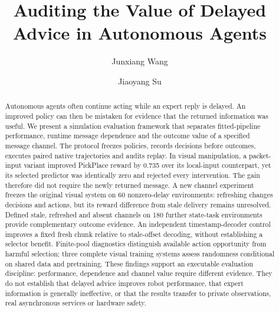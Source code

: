 \documentclass[smallextended]{svjour3}
\begin{document}
\title{Auditing the Value of Delayed Advice in Autonomous Agents}
\author{Junxiang Wang \and Jiaoyang Su}
\date{}
\maketitle
\begin{abstract}
Autonomous agents often continue acting while an expert reply is delayed. An improved policy can then be mistaken for evidence that the returned information was useful. We present a simulation evaluation framework that separates fitted-pipeline performance, runtime message dependence and the outcome value of a specified message channel. The protocol freezes policies, records decisions before outcomes, executes paired native trajectories and audits replay. In visual manipulation, a packet-input variant improved PickPlace reward by 0.735 over its local-input counterpart, yet its selected predictor was identically zero and rejected every intervention. The gain therefore did not require the newly returned message. A new channel experiment freezes the original visual system on 60 nonzero-delay environments: refreshing changes decisions and actions, but its reward difference from stale delivery remains unresolved. Defined stale, refreshed and absent channels on 180 further state-task environments provide complementary outcome evidence. An independent timestamp-decoder control improves a fixed fresh chunk relative to stale-offset decoding, without establishing a selector benefit. Finite-pool diagnostics distinguish available action opportunity from harmful selection; three complete visual training systems assess randomness conditional on shared data and pretraining. These findings support an executable evaluation discipline: performance, dependence and channel value require different evidence. They do not establish that delayed advice improves robot performance, that expert information is generally ineffective, or that the results transfer to private observations, real asynchronous services or hardware safety.
\end{abstract}









\end{document}
